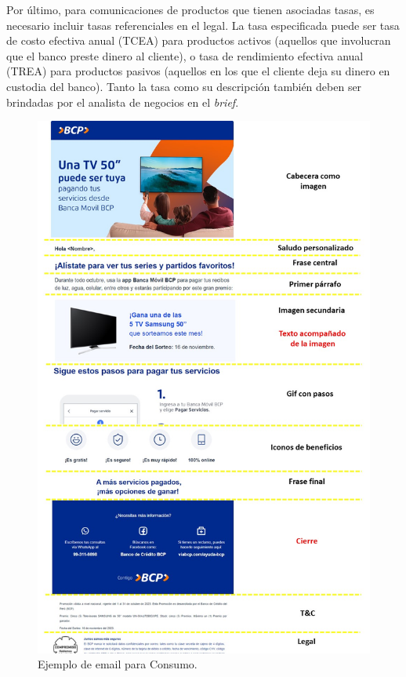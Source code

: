 Por último, para comunicaciones de productos que tienen asociadas tasas, es necesario incluir tasas referenciales en el legal. La tasa especificada puede ser tasa de costo efectiva anual (TCEA) para productos activos (aquellos que involucran que el banco preste dinero al cliente), o tasa de rendimiento efectiva anual (TREA) para productos pasivos (aquellos en los que el cliente deja su dinero en custodia del banco). Tanto la tasa como su descripción también deben ser brindadas por el analista de negocios en el \textit{brief}.

\cleardoublepage
\begin{figure}[!htpb]
     \centering
     \includegraphics[width=1\textwidth]{./Figures/ejemplo_Consumo}
    \caption{Ejemplo de email para Consumo.}
    \label{fig:EjConsumo}
\end{figure}

